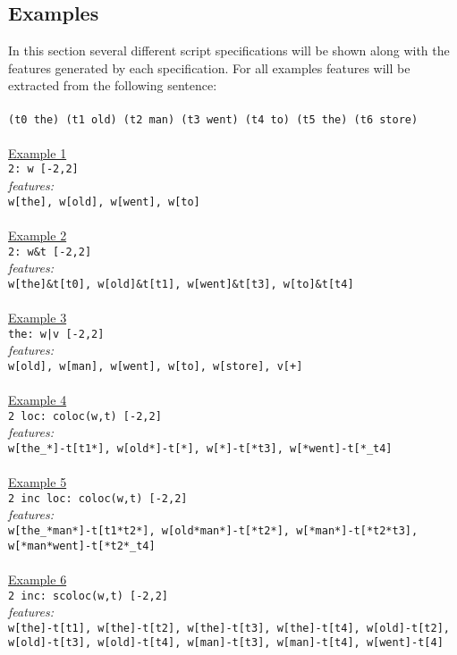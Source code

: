 \documentclass[11pt]{article}
\begin{document}
\subsection*{Examples}

In this section several different script specifications will be shown along with
the features generated by each specification.  For all examples features will be
extracted from the following sentence:\\ \\ 
{\tt (t0 the) (t1 old) (t2 man) (t3 went) (t4 to) (t5 the) (t6 store)} \\ \\
\underline {Example 1} \\
{\tt 2: w [-2,2]}\\
{\em features:} \\
{\tt w[the], w[old], w[went], w[to]} \\ \\
\underline {Example 2} \\
{\tt 2: w\&t [-2,2]}\\
{\em features:} \\
{\tt w[the]\&t[t0], w[old]\&t[t1], w[went]\&t[t3], w[to]\&t[t4]} \\ \\
\underline {Example 3} \\
{\tt the: w|v [-2,2]}\\
{\em features:} \\
{\tt w[old], w[man], w[went], w[to], w[store], v[+]} \\ \\ 
\underline {Example 4} \\
{\tt 2 loc: coloc(w,t) [-2,2]}\\
{\em features:} \\
{\tt w[the\_*]-t[t1*], w[old*]-t[*], w[*]-t[*t3], w[*went]-t[*\_t4]}\\ \\ 
\underline {Example 5} \\
{\tt 2 inc loc: coloc(w,t) [-2,2]}\\
{\em features:} \\
{\tt w[the\_*man*]-t[t1*t2*], w[old*man*]-t[*t2*], w[*man*]-t[*t2*t3], \\ 
   w[*man*went]-t[*t2*\_t4]}\\ \\
\underline {Example 6} \\
{\tt 2 inc: scoloc(w,t) [-2,2]}\\
{\em features:} \\
{\tt w[the]-t[t1], w[the]-t[t2], w[the]-t[t3], w[the]-t[t4], w[old]-t[t2], \\
w[old]-t[t3], w[old]-t[t4], w[man]-t[t3], w[man]-t[t4], w[went]-t[4]}\\ \\  
\end{document}
